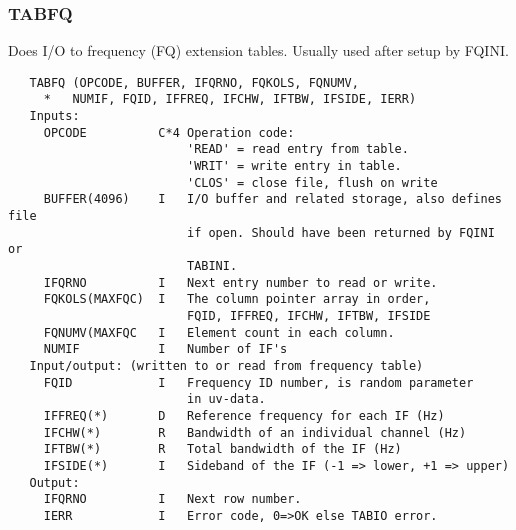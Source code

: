 \subsubsection{TABFQ}
Does I/O to frequency (FQ) extension tables. Usually used after
setup by FQINI.
\begin{verbatim}
   TABFQ (OPCODE, BUFFER, IFQRNO, FQKOLS, FQNUMV,
     *   NUMIF, FQID, IFFREQ, IFCHW, IFTBW, IFSIDE, IERR)
   Inputs:
     OPCODE          C*4 Operation code:
                         'READ' = read entry from table.
                         'WRIT' = write entry in table.
                         'CLOS' = close file, flush on write
     BUFFER(4096)    I   I/O buffer and related storage, also defines file
                         if open. Should have been returned by FQINI or
                         TABINI.
     IFQRNO          I   Next entry number to read or write.
     FQKOLS(MAXFQC)  I   The column pointer array in order,
                         FQID, IFFREQ, IFCHW, IFTBW, IFSIDE
     FQNUMV(MAXFQC   I   Element count in each column.
     NUMIF           I   Number of IF's
   Input/output: (written to or read from frequency table)
     FQID            I   Frequency ID number, is random parameter
                         in uv-data.
     IFFREQ(*)       D   Reference frequency for each IF (Hz)
     IFCHW(*)        R   Bandwidth of an individual channel (Hz)
     IFTBW(*)        R   Total bandwidth of the IF (Hz)
     IFSIDE(*)       I   Sideband of the IF (-1 => lower, +1 => upper)
   Output:
     IFQRNO          I   Next row number.
     IERR            I   Error code, 0=>OK else TABIO error.
\end{verbatim}

